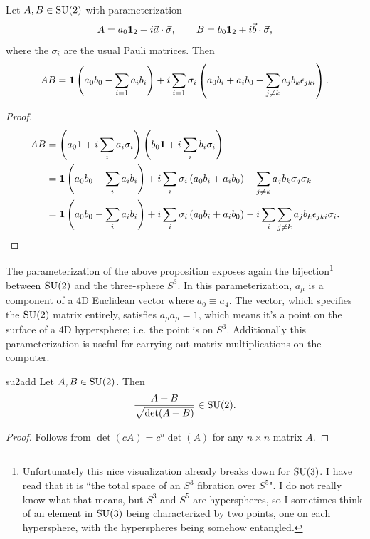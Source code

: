 \begin{proposition}{}{}
  Let $A,B\in\operatorname{SU}(2)$ with parameterization
  $$
    A=a_0{\mathbf 1}_2+i\vec{a}\cdot\vec{\sigma}, \qquad
    B=b_0{\mathbf 1}_2+i\vec{b}\cdot\vec{\sigma},
  $$
  where the $\sigma_i$ are the usual Pauli matrices. Then
  \begin{equation*}
    AB={\mathbf 1}\left(a_0b_0-\sum\limits_{i=1}a_ib_i\right)
        +i\sum\limits_{i=1}\sigma_i\left(a_0b_i+a_ib_0
          -\sum\limits_{j\neq k}a_jb_k\epsilon_{jki}\right).
  \end{equation*}
  \begin{proof}
    \begin{equation*}
      \begin{aligned}
        AB&=\left(a_0{\mathbf 1}+i\sum\limits_ia_i\sigma_i\right)
            \left(b_0{\mathbf 1}+i\sum\limits_ib_i\sigma_i\right)\\
          &={\mathbf 1}\left(a_0b_0-\sum\limits_ia_ib_i\right)
            +i\sum\limits_i\sigma_i\left(a_0b_i+a_ib_0\right)
            -\sum\limits_{j\neq k}a_jb_k\sigma_j\sigma_k \\
          &={\mathbf 1}\left(a_0b_0-\sum\limits_ia_ib_i\right)
            +i\sum\limits_i\sigma_i\left(a_0b_i+a_ib_0\right)
            -i\sum\limits_i
                \sum\limits_{j\neq k}a_jb_k\epsilon_{jki}\sigma_i.
      \end{aligned}
    \end{equation*}
  \end{proof}
\end{proposition}
The parameterization of the above proposition exposes again
the bijection\footnote{Unfortunately this nice visualization
already breaks down for $\operatorname{SU}(3)$. I have read that it is ``the total space of 
an $S^3$ fibration over $S^5$". I do not really know what that means, but $S^3$
and $S^5$ are hyperspheres, so I sometimes think of an element in $\operatorname{SU}(3)$ being
characterized by two points, one on each hypersphere, with the hyperspheres
being somehow entangled.} between $\operatorname{SU}(2)$ and the three-sphere $S^3$.
In this parameterization, $a_\mu$ is a component of a 4D Euclidean vector where
$a_0\equiv a_4$. The vector, which specifies the $\operatorname{SU}(2)$ matrix entirely,
satisfies $a_\mu a_\mu=1$, which means it's a point on the surface of a 4D
hypersphere; i.e. the point is on $S^3$.
Additionally this parameterization is useful for carrying out
matrix multiplications on the computer.

\begin{proposition}{}{su2add}
  Let $A,B\in\operatorname{SU}(2)$. Then
  $$
  \frac{A+B}{\sqrt{\det(A+B)}}\in\operatorname{SU}(2).
  $$
  \begin{proof}
    Follows from $\det(cA)=c^n\det(A)$ for any $n\times n$ matrix $A$.
  \end{proof}
\end{proposition}

